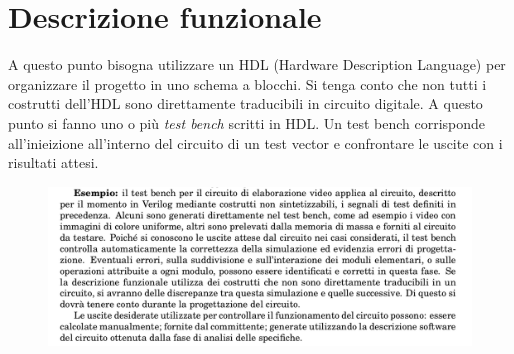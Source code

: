 \documentclass{book}
\begin{document}
\section{Descrizione funzionale}
    A questo punto bisogna utilizzare un HDL (Hardware Description Language) per organizzare il progetto in uno schema a blocchi. Si tenga conto che non tutti i costrutti dell'HDL sono direttamente traducibili in circuito digitale. A questo punto si fanno uno o più \textit{test bench} scritti in HDL. Un test bench corrisponde all'inieizione all'interno del circuito di un test vector e confrontare le uscite con i risultati attesi.
    \begin{figure}[h!]
        \centering
        \includegraphics[width=1.1\linewidth]{img/chapt3img2.png}
    \end{figure}
\end{document}

